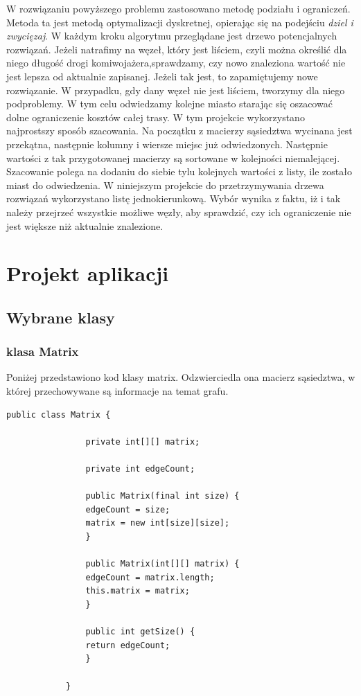 \documentclass{article}
\begin{document}
				W rozwiązaniu powyższego problemu zastosowano metodę podziału i ograniczeń. Metoda ta jest metodą optymalizacji dyskretnej, opierając się na podejściu \textit{dziel i zwycięzaj}.
				W każdym kroku algorytmu przeglądane jest drzewo potencjalnych rozwiązań. Jeżeli natrafimy na węzeł, który jest liściem, czyli można określić dla niego długość drogi komiwojażera,sprawdzamy, czy nowo znaleziona wartość nie jest lepsza od aktualnie zapisanej. Jeżeli tak jest, to zapamiętujemy nowe rozwiązanie. W przypadku, gdy dany węzeł nie jest liściem, tworzymy dla niego podproblemy. W tym celu odwiedzamy kolejne miasto starając się oszacować dolne ograniczenie kosztów całej trasy. W tym projekcie wykorzystano najprostszy sposób szacowania. Na początku z macierzy sąsiedztwa wycinana jest przekątna, następnie kolumny i wiersze miejsc już odwiedzonych. Następnie wartości z tak przygotowanej macierzy są sortowane w kolejności niemalejącej. Szacowanie polega na dodaniu do siebie tylu kolejnych wartości z listy, ile zostało miast do odwiedzenia. W niniejszym projekcie do przetrzymywania drzewa rozwiązań wykorzystano listę jednokierunkową. Wybór wynika z faktu, iż i tak należy przejrzeć wszystkie możliwe węzły, aby sprawdzić, czy ich ograniczenie nie jest większe niż aktualnie znalezione.
				
\section{Projekt aplikacji}	
	\subsection{Wybrane klasy}
	
		\subsubsection{klasa Matrix}
			Poniżej przedstawiono kod klasy matrix. Odzwierciedla ona macierz sąsiedztwa, w której przechowywane są informacje na temat grafu.
			
			\begin{lstlisting}[xleftmargin=-100pt]
			public class Matrix {
			
				private int[][] matrix;
			
				private int edgeCount;
				
				public Matrix(final int size) {
				edgeCount = size;
				matrix = new int[size][size];
				}
				
				public Matrix(int[][] matrix) {
				edgeCount = matrix.length;
				this.matrix = matrix;
				}
										
				public int getSize() {
				return edgeCount;
				}
				
			}
			\end{lstlisting}
\end{document}

